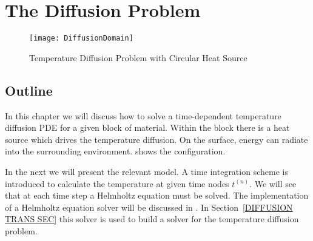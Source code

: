 
%
%
%


\section{The Diffusion Problem}
\label{DIFFUSION CHAP}

\begin{figure}
\centerline{\texttt{[image: DiffusionDomain]}}
\caption{Temperature Diffusion Problem with Circular Heat Source}
\label{DIFFUSION FIG 1}
\end{figure}

\subsection{\label{DIFFUSION OUT SEC}Outline}
In this chapter we will discuss how to solve a time-dependent temperature
diffusion PDE for a given block of material.
Within the block there is a heat source which drives the temperature diffusion.
On the surface, energy can radiate into the surrounding environment.
 shows the configuration.

In the next  we will present the relevant model.
A time integration scheme is introduced to calculate the temperature at given time nodes $t^{(n)}$.
We will see that at each time step a Helmholtz equation must be solved. 
The implementation of a Helmholtz equation solver will be discussed in . 
In Section~\ref{DIFFUSION TRANS SEC} this solver is used to build a solver for
the temperature diffusion problem.

